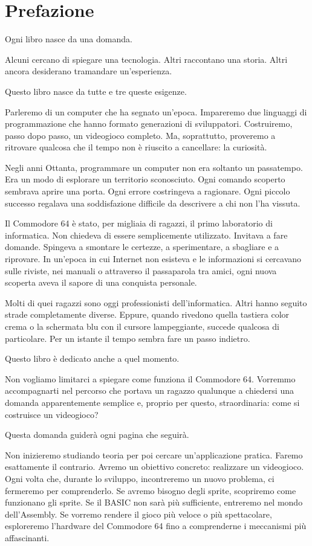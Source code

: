 \documentclass{article}
\author{HP}
\date{2026-07-26}
\begin{document}
\section{Prefazione}
Ogni libro nasce da una domanda.

Alcuni cercano di spiegare una tecnologia. Altri raccontano una storia. Altri ancora desiderano tramandare
un'esperienza.

Questo libro nasce da tutte e tre queste esigenze.

Parleremo di un computer che ha segnato un'epoca. Impareremo due linguaggi di programmazione che hanno formato
generazioni di sviluppatori. Costruiremo, passo dopo passo, un videogioco completo. Ma, soprattutto, proveremo a
ritrovare qualcosa che il tempo non è riuscito a cancellare: la curiosità.

Negli anni Ottanta, programmare un computer non era soltanto un passatempo. Era un modo di esplorare un territorio
sconosciuto. Ogni comando scoperto sembrava aprire una porta. Ogni errore costringeva a ragionare. Ogni piccolo
successo regalava una soddisfazione difficile da descrivere a chi non l'ha vissuta.

Il Commodore 64 è stato, per migliaia di ragazzi, il primo laboratorio di informatica. Non chiedeva di essere
semplicemente utilizzato. Invitava a fare domande. Spingeva a smontare le certezze, a sperimentare, a sbagliare e a
riprovare. In un'epoca in cui Internet non esisteva e le informazioni si cercavano sulle riviste, nei manuali o
attraverso il passaparola tra amici, ogni nuova scoperta aveva il sapore di una conquista personale.

Molti di quei ragazzi sono oggi professionisti dell'informatica. Altri hanno seguito strade completamente diverse.
Eppure, quando rivedono quella tastiera color crema o la schermata blu con il cursore lampeggiante, succede qualcosa di
particolare. Per un istante il tempo sembra fare un passo indietro.

Questo libro è dedicato anche a quel momento.

Non vogliamo limitarci a spiegare come funziona il Commodore 64. Vorremmo accompagnarti nel percorso che portava un
ragazzo qualunque a chiedersi una domanda apparentemente semplice e, proprio per questo, straordinaria: come si
costruisce un videogioco?

Questa domanda guiderà ogni pagina che seguirà.

Non inizieremo studiando teoria per poi cercare un'applicazione pratica. Faremo esattamente il contrario. Avremo un
obiettivo concreto: realizzare un videogioco. Ogni volta che, durante lo sviluppo, incontreremo un nuovo problema, ci
fermeremo per comprenderlo. Se avremo bisogno degli sprite, scopriremo come funzionano gli sprite. Se il BASIC non sarà
più sufficiente, entreremo nel mondo dell'Assembly. Se vorremo rendere il gioco più veloce o più spettacolare,
esploreremo l'hardware del Commodore 64 fino a comprenderne i meccanismi più affascinanti.
\end{document}

